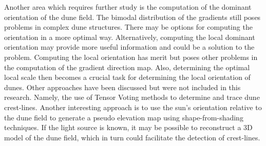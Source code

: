 Another area which requires further study is the computation of the dominant orientation of the dune field. The bimodal distribution of the gradients still poses problems in complex dune structures. There may be options for computing the orientation in a more optimal way. Alternatively, computing the local dominant orientation may provide more useful information and could be a solution to the problem. Computing the local orientation has merit but poses other problems in the computation of the gradient direction map. Also, determining the optimal local scale then becomes a crucial task for determining the local orientation of dunes. Other approaches have been discussed but were not included in this research. Namely, the use of Tensor Voting methods to determine and trace dune crest-lines. Another interesting approach is to use the sun's orientation relative to the dune field to generate a pseudo elevation map using shape-from-shading techniques. If the light source is known, it may be possible to reconstruct a 3D model of the dune field, which in turn could facilitate the detection of crest-lines.